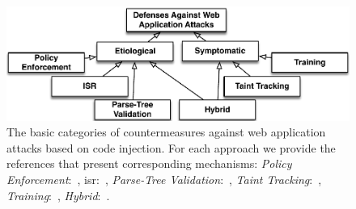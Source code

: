 \documentclass[10pt,journal,compsoc]{IEEEtran}
\begin{document}
\begin{figure}[t]
\begin{center}
\leavevmode
\includegraphics[scale=0.53]{defenses.pdf}
\end{center}
\vspace{-5.8mm}
\caption{\label{fig:defenses}The basic categories of countermeasures
against web application attacks based on code
injection. For each approach we provide the references
that present corresponding mechanisms:
{\it Policy Enforcement}:~\cite{NSS06,JKK06a,KJKV09,TNH07,RDWDE07,YCIS07,OWVS08,PSC09,ML10,DDHPJ10,PS11,VDDPJ11,BV08,SSM10},
{\sc isr}:~\cite{BK04,JB07,GC09,APKLM10},
{\it Parse-Tree Validation}:~\cite{BWS05,SW06},
{\it Taint Tracking}:~\cite{HCF05,PB05,XBS06,NLC07,VFJKKV07,PMP11,SLMS14},
{\it Training}:~\cite{LLW02,HO05b,VMV05,JEP08,WPLKK09,MS09,MKLS11},
{\it Hybrid}:~\cite{BV08,LV09,SMS13,HBBS14,SYMRHKM14,BCJPST15,CVMA07,GLSTMMR12,CPSPBCCSL12}.}
\vspace{-5.5mm}
\end{figure}
\end{document}
